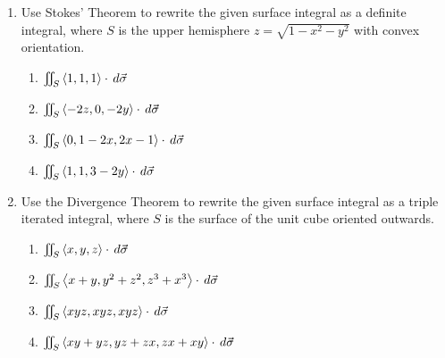 \begin{enumerate}
    \item Use Stokes' Theorem to rewrite the given surface integral as a definite integral, where $S$ is the upper hemisphere $z=\sqrt{1-x^2-y^2}$ with convex orientation.

      \begin{enumerate}
        \item $\iint_S \left<1,1,1\right>\cdot\,d{\vec{\sigma}}$
        \item $\iint_S \left<-2z,0,-2y\right>\cdot\,d{\vec{\sigma}}$
        \item $\iint_S \left<0,1-2x,2x-1\right>\cdot\,d{\vec{\sigma}}$
        \item $\iint_S \left<1,1,3-2y\right>\cdot\,d{\vec\sigma}$
      \end{enumerate}

    \item Use the Divergence Theorem to rewrite the given surface integral as a triple iterated integral, where $S$ is the surface of the unit cube oriented outwards.

      \begin{enumerate}
        \item $\iint_S \left<x,y,z\right>\cdot\,d{\vec\sigma}$
        \item $\iint_S \left<x+y,y^2+z^2,z^3+x^3\right>\cdot\,d{\vec\sigma}$
        \item $\iint_S \left<xyz,xyz,xyz\right>\cdot\,d{\vec\sigma}$
        \item $\iint_S \left<xy+yz,yz+zx,zx+xy\right>\cdot\,d{\vec\sigma}$
      \end{enumerate}

    \end{enumerate}



